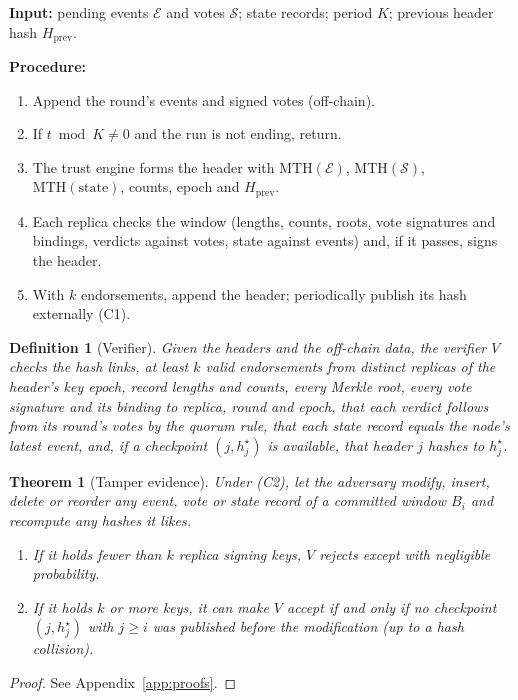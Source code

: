 \documentclass{ieeeaccess}
\newtheorem{theorem}{Theorem}
\newtheorem{definition}{Definition}
\begin{document}
\begin{algorithm}[!t]
\caption{Audit-log commit at round $t$.}
\label{alg:anchor}
\noindent\textbf{Input:} pending events $\mathcal{E}$ and votes
$\mathcal{S}$; state records; period $K$; previous header hash
$H_{\mathrm{prev}}$.

\noindent\textbf{Procedure:}
\begin{enumerate}\setlength{\itemsep}{0pt}\setlength{\parskip}{0pt}
  \item Append the round's events and signed votes (off-chain).
  \item If $t \bmod K \neq 0$ and the run is not ending, return.
  \item The trust engine forms the header with
        $\mathrm{MTH}(\mathcal{E})$, $\mathrm{MTH}(\mathcal{S})$,
        $\mathrm{MTH}(\text{state})$, counts, epoch and
        $H_{\mathrm{prev}}$.
  \item Each replica checks the window (lengths, counts, roots, vote
        signatures and bindings, verdicts against votes, state against
        events) and, if it passes, signs the header.
  \item With $k$ endorsements, append the header; periodically
        publish its hash externally (C1).
\end{enumerate}
\end{algorithm}

\begin{definition}[Verifier]
Given the headers and the off-chain data, the verifier $V$ checks the
hash links, at least $k$ valid endorsements from distinct replicas of
the header's key epoch, record lengths and counts, every Merkle root,
every vote signature and its binding to replica, round and epoch, that
each verdict follows from its round's votes by the quorum rule, that
each state record equals the node's latest event, and, if a checkpoint
$(j,h^{\star}_j)$ is available, that header $j$ hashes to $h^{\star}_j$.
\end{definition}

\begin{theorem}[Tamper evidence]\label{thm:tamper}
Under (C2), let the adversary modify, insert, delete or reorder any
event, vote or state record of a committed window $B_i$ and recompute
any hashes it likes.
\begin{enumerate}
\item If it holds fewer than $k$ replica signing keys, $V$ rejects
except with negligible probability.
\item If it holds $k$ or more keys, it can make $V$ accept if and only
if no checkpoint $(j,h^{\star}_j)$ with $j\ge i$ was published before
the modification (up to a hash collision).
\end{enumerate}
\end{theorem}
\begin{proof}
See Appendix~\ref{app:proofs}.
\end{proof}
\end{document}
